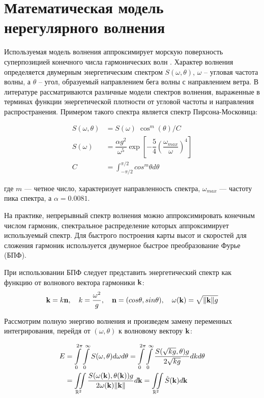 \section{Математическая модель нерегулярного волнения}

Используемая модель волнения аппроксимирует морскую поверхность суперпозицией конечного числа гармонических волн \citep{lopatuhin2004}. Характер волнения определяется двумерным энергетическим спектром $S(\omega, \theta)$, $\omega$ -- угловая частота волны, а $\theta$ -- угол, образуемый направлением бега волны с направлением ветра. В литературе \citep{lopatuhin2004} рассматриваются различные модели спектров волнения, выраженные в терминах функции энергетической плотности от угловой частоты и направления распространения. Примером такого спектра является спектр Пирсона-Московица:

\begin{equation}
	\label{envmath2:spectra}
	\begin{split}
	S(\omega, \theta) &= S(\omega) \; \cos^m (\theta) / C \\
	S(\omega) &= \dfrac{\alpha g^2}{\omega^5} \exp \left[ 
	  -\dfrac{5}{4} \left( \dfrac{\omega_{max}}{\omega} \right)^{4} 
	\right]  \\
	C &= \int_{-\pi/2}^{\pi/2} cos^m\theta d\theta
	\end{split}
\end{equation}

где $m$ --- четное число, характеризует направленность спектра, $\omega_{max}$ --- частоту пика спектра, а $\alpha = 0.0081$.

На практике, непрерывный спектр волнения можно аппроксимировать конечным числом гармоник, спектральное распределение которых аппроксимирует используемый спектр. Для быстрого построения карты высот и скоростей для сложения гармоник используется двумерное быстрое преобразование Фурье (БПФ).
 
При использовании БПФ следует представить энергетический спектр как функцию от волнового вектора гармоники $\mathbf{k}$:
$$ \mathbf{k} = k\mathbf{n},\quad 
k = \frac{\omega^2}{g} ,\quad 
\mathbf{n}=(cos \theta, sin \theta), \quad 
\omega(\mathbf{k}) = \sqrt{\lVert \mathbf{k} \rVert g} $$

Рассмотрим полную энергию волнения и произведем замену переменных интегрирования, перейдя от $(\omega, \theta)$ к волновому вектору $\mathbf{k}$:

\begin{equation}
	\begin{split}
	E &= \int\limits_0^{2\pi}
		 \int\limits_0^\infty S(\omega, \theta) d\omega d\theta
	  = \int\limits_0^{2\pi}
		 \int\limits_0^\infty 
			 \frac {S(\sqrt{kg}, \theta)g} {2\sqrt{kg}} dk d\theta\\
	  &= \iint\limits_{\mathbb{R}^2}
			 \frac{S(\omega(\mathbf{k}), \theta(\mathbf{k})) g}
				  {2\omega(\mathbf{k}) \lVert \mathbf{k} \rVert} d\mathbf{k}
	  = \iint\limits_{\mathbb{R}^2} \hat{S}(\mathbf{k})d\mathbf{k}
	\end{split}
\end{equation}

